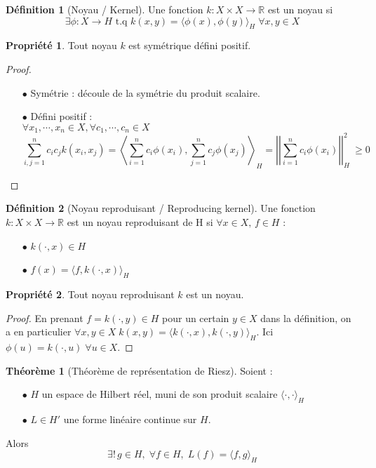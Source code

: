 \documentclass[a4paper, 11pt, french]{article}
\theoremstyle{definition}
\newtheorem{definition}{Définition}
\newtheorem{theorem}{Théorème}
\newtheorem{property}{Propriété}
\begin{document}
	\begin{definition}[Noyau / Kernel]
		Une fonction $k : X \times X \to \mathbb{R}$ est un noyau si
		\[ \exists \phi : X \to H \text{ t.q } k(x,y) = \langle \phi (x), \phi(y) \rangle_H \; \forall x,y \in X \]
	\end{definition}

	\begin{property}
		Tout noyau $k$ est symétrique défini positif.
	\end{property}
	\begin{proof}
		\begin{itemize}
			\item[$\bullet$] Symétrie : découle de la symétrie du produit scalaire.			
			\item[$\bullet$] Défini positif : \\
			$\forall x_1, \cdots, x_n \in X, \forall c_1, \cdots, c_n \in X$
			\[\sum_{i,j=1}^{n} c_i c_j k(x_i, x_j) = \left\langle \sum_{i=1}^{n} c_i \phi(x_i), \sum_{j=1}^{n} c_j \phi(x_j) \right\rangle_H = \left|\left|\sum_{i=1}^{n} c_i \phi(x_i)\right|\right|_H^2\ \geq 0\]
		\end{itemize}
	\end{proof}

	\begin{definition}[Noyau reproduisant / Reproducing kernel]
		Une fonction $k : X \times X \to \mathbb{R}$ est un noyau reproduisant de H si $\forall x \in X, \, f \in H$ :
		\begin{itemize}
			\item[$\bullet$] $k(\cdot, x) \in H$			
			\item[$\bullet$] $f(x) = \langle f, k(\cdot, x) \rangle_H$
		\end{itemize}
	\end{definition}

	\newpage

	\begin{property}
		Tout noyau reproduisant $k$ est un noyau.
	\end{property}
	\begin{proof}
		En prenant $f = k(\cdot, y) \in H$ pour un certain $y \in X$ dans la définition, on a en particulier $\forall x, y \in X \; k(x,y) = \langle k(\cdot, x), k(\cdot, y) \rangle_H$. Ici $\phi(u) = k(\cdot, u) \; \forall u \in X$.
	\end{proof}

	\begin{theorem}[Théorème de représentation de Riesz]
		Soient :
		\begin{itemize}
			\item[$\bullet$] $H$ un espace de Hilbert réel, muni de son produit scalaire $\langle \cdot, \cdot \rangle_H$
			\item[$\bullet$] $L \in H'$ une forme linéaire continue sur $H$.
		\end{itemize}
		Alors \[\exists ! \, g \in H, \; \forall f \in H, \; L(f) = \langle f, g \rangle_H\]
	\end{theorem}
\end{document}
